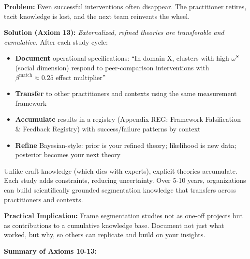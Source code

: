 \textbf{Problem:} Even successful interventions often disappear. The practitioner retires, tacit knowledge is lost, and the next team reinvents the wheel.

\textbf{Solution (Axiom 13):} \emph{Externalized, refined theories are transferable and cumulative.} After each study cycle:

\begin{itemize}[nosep]
\item \textbf{Document} operational specifications: ``In domain X, clusters with high $\omega^S$ (social dimension) respond to peer-comparison interventions with $\beta^{\text{match}} \approx 0.25$ effect multiplier''
\item \textbf{Transfer} to other practitioners and contexts using the same measurement framework
\item \textbf{Accumulate} results in a registry (Appendix REG: Framework Falsification \& Feedback Registry) with success/failure patterns by context
\item \textbf{Refine} Bayesian-style: prior is your refined theory; likelihood is new data; posterior becomes your next theory
\end{itemize}

Unlike craft knowledge (which dies with experts), explicit theories accumulate. Each study adds constraints, reducing uncertainty. Over 5-10 years, organizations can build scientifically grounded segmentation knowledge that transfers across practitioners and contexts. \cite{camerer2018evaluatingevaluating, osc2015, PAP-nosek2015}

\textbf{Practical Implication:} Frame segmentation studies not as one-off projects but as contributions to a cumulative knowledge base. Document not just what worked, but why, so others can replicate and build on your insights.

\vspace{1em}

\textbf{Summary of Axioms 10-13:}

